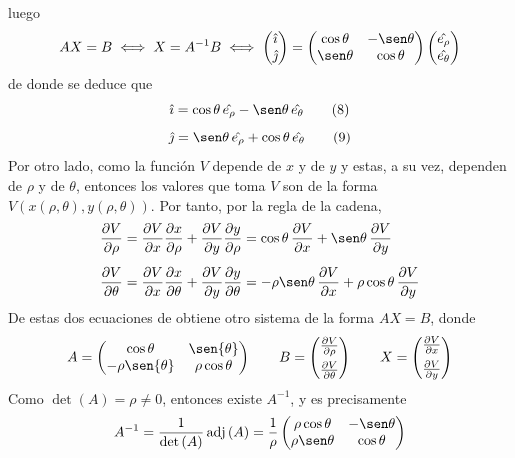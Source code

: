 \documentclass[12pt]{report}
\begin{document}
luego
\[AX=B \iff X = A^{-1}B \iff 
\begin{pmatrix}
\hat{\imath} \\
\hat{\jmath}
\end{pmatrix}
=
\begin{pmatrix}
    \cos\theta & -\sen\theta \\
    \sen\theta & \cos\theta
\end{pmatrix}
\begin{pmatrix}
\hat{e_\rho} \\
\hat{e_\theta}
\end{pmatrix}
\]
de donde se deduce que
\[
\hat{\imath} = \cos\theta \, \hat{e_\rho}-\sen\theta \, \hat{e_\theta} \tag{8}
\]
\[
\hat{\jmath} = \sen\theta \, \hat{e_\rho}+\cos\theta \, \hat{e_\theta} \tag{9}
\]
Por otro lado, como la función $V$ depende de $x$ y de $y$ y estas, a su vez, dependen de $\rho$ y de $\theta$, entonces los valores que toma $V$ son de la forma $V(x(\rho,\theta),y(\rho,\theta))$. Por tanto, por la regla de la cadena,
\[
\begin{aligned}[t]
\frac{\partial V}{\partial \rho} &= \frac{\partial V}{\partial x}\frac{\partial x}{\partial \rho}+\frac{\partial V}{\partial y}\frac{\partial y}{\partial \rho} = \cos\theta \, \frac{\partial V}{\partial x}+\sen\theta \, \frac{\partial V}{\partial y} \\[5pt]
\frac{\partial V}{\partial \theta} &= \frac{\partial V}{\partial x}\frac{\partial x}{\partial \theta}+\frac{\partial V}{\partial y}\frac{\partial y}{\partial \theta} = -\rho \sen\theta \, \frac{\partial V}{\partial x}+\rho \cos\theta \, \frac{\partial V}{\partial y}
\end{aligned}
\]
De estas dos ecuaciones de obtiene otro sistema de la forma $AX=B$, donde
\[
A = \begin{pmatrix}
\cos{\theta} & \sen{\theta} \\
-\rho\sen{\theta} & \rho\cos{\theta}
\end{pmatrix}
\qquad
B = \begin{pmatrix}
\frac{\partial V}{\partial \rho} \\[5pt]
\frac{\partial V}{\partial \theta}
\end{pmatrix}
\qquad
X = \begin{pmatrix}
\frac{\partial V}{\partial x} \\[5pt]
\frac{\partial V}{\partial y}
\end{pmatrix}
\]
Como $\det{(A)}=\rho \neq 0$, entonces existe $A^{-1}$, y es precisamente
\[
A^{-1}=\frac{1}{\det{(A)}}\, \mathrm{adj} \, (A) = \frac{1}{\rho}\begin{pmatrix}
    \rho\cos\theta & -\sen\theta \\
    \rho\sen\theta & \cos\theta
\end{pmatrix}
\]
\end{document}
